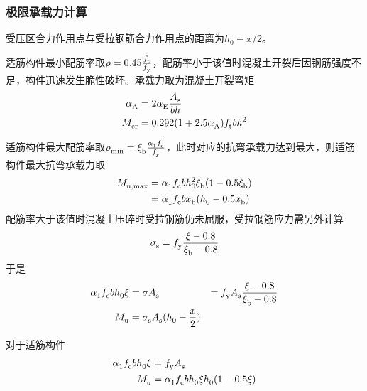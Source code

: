 \documentclass{article}
\begin{document}
\subsubsection{极限承载力计算}
\par 受压区合力作用点与受拉钢筋合力作用点的距离为$h_0-x/2$。
\par 适筋构件最小配筋率取$\rho=0.45\frac{\script{f}{t}}{\script{f}{y}}$，配筋率小于该值时混凝土开裂后因钢筋强度不足，构件迅速发生脆性破坏。承载力取为混凝土开裂弯矩
\begin{align*}
      \script{\alpha}{A} & = 2\script{\alpha}{E}\frac{\script{A}{s}}{bh}     \\
      \script{M}{cr}     & = 0.292(1+2.5\script{\alpha}{A})\script{f}{t}bh^2
\end{align*}
\par 适筋构件最大配筋率取$\script{\rho}{min}=\script{\xi}{b}\frac{\script{\alpha}{1}\script{f}{c}}{\script{f}{y}}$，此时对应的抗弯承载力达到最大，则适筋构件最大抗弯承载力取
\begin{align*}
      \script{M}{u,max} & = \script{\alpha}{1}\script{f}{c}b\script{h}[2]{0}\script{\xi}{b}(1-0.5\script{\xi}{b}) \\
                        & = \script{\alpha}{1}\script{f}{c}b\script{x}{b}(\script{h}{0}-0.5\script{x}{b})
\end{align*}
配筋率大于该值时混凝土压碎时受拉钢筋仍未屈服，受拉钢筋应力需另外计算
\begin{align*}
      \script{\sigma}{s} & = \script{f}{y} \frac{\xi-0.8}{\script{\xi}{b}-0.8} \\
\end{align*}
于是
\begin{align*}
      \script{\alpha}{1}\script{f}{c}b\script{h}{0}\xi & = \sigma \script{A}{s}                                         & = \script{f}{y} \script{A}{s} \frac{\xi-0.8}{\script{\xi}{b}-0.8} \\
      \script{M}{u}                                    & = \script{\sigma}{s} \script{A}{s} (\script{h}{0}-\frac{x}{2})
\end{align*}
\par 对于适筋构件
\begin{align*}
      \script{\alpha}{1} \script{f}{c} b \script{h}{0} \xi & = \script{f}{y} \script{A}{s}                                                  \\
      \script{M}{u}                                        & = \script{\alpha}{1} \script{f}{c} b \script{h}{0} \xi \script{h}{0}(1-0.5\xi)
\end{align*}
\end{document}
